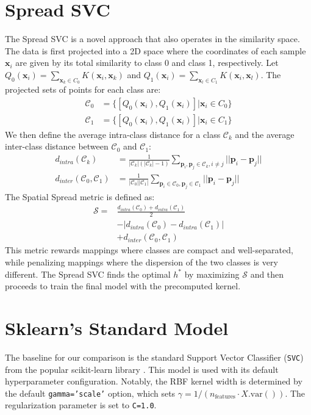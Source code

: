 \documentclass[conference]{IEEEtran}
\begin{document}
\section{Spread SVC}
The Spread SVC is a novel approach that also operates in the similarity space. The data is first projected into a 2D space where the coordinates of each sample $\mathbf{x}_i$ are given by its total similarity to class 0 and class 1, respectively. Let $Q_0(\mathbf{x}_i) = \sum_{\mathbf{x}_k \in C_0} K(\mathbf{x}_i, \mathbf{x}_k)$ and $Q_1(\mathbf{x}_i) = \sum_{\mathbf{x}_l \in C_1} K(\mathbf{x}_i, \mathbf{x}_l)$. The projected sets of points for each class are:
\begin{align}
    \mathcal{C}_0 &= \{[Q_0(\mathbf{x}_i), Q_1(\mathbf{x}_i)] | \mathbf{x}_i \in C_0\} \\
    \mathcal{C}_1 &= \{[Q_0(\mathbf{x}_i), Q_1(\mathbf{x}_i)] | \mathbf{x}_i \in C_1\}
\end{align}
We then define the average intra-class distance for a class $\mathcal{C}_k$ and the average inter-class distance between $\mathcal{C}_0$ and $\mathcal{C}_1$:
\begin{align}
    d_{intra}(\mathcal{C}_k) &= \frac{1}{|\mathcal{C}_k|(|\mathcal{C}_k|-1)} \sum_{\mathbf{p}_i, \mathbf{p}_j \in \mathcal{C}_k, i \neq j} ||\mathbf{p}_i - \mathbf{p}_j|| \\
    d_{inter}(\mathcal{C}_0, \mathcal{C}_1) &= \frac{1}{|\mathcal{C}_0||\mathcal{C}_1|} \sum_{\mathbf{p}_i \in \mathcal{C}_0, \mathbf{p}_j \in \mathcal{C}_1} ||\mathbf{p}_i - \mathbf{p}_j||
\end{align}
The Spatial Spread metric is defined as:
\begin{equation}
\begin{split}
    \mathcal{S} = & \frac{d_{intra}(\mathcal{C}_0) + d_{intra}(\mathcal{C}_1)}{2} \\
                  & - |d_{intra}(\mathcal{C}_0) - d_{intra}(\mathcal{C}_1)| \\
                  & + d_{inter}(\mathcal{C}_0, \mathcal{C}_1)
\end{split}
\end{equation}
This metric rewards mappings where classes are compact and well-separated, while penalizing mappings where the dispersion of the two classes is very different. The Spread SVC finds the optimal $h^*$ by maximizing $\mathcal{S}$ and then proceeds to train the final model with the precomputed kernel.

\section{Sklearn's Standard Model}
The baseline for our comparison is the standard Support Vector Classifier (\texttt{SVC}) from the popular scikit-learn library \cite{b2}. This model is used with its default hyperparameter configuration. Notably, the RBF kernel width is determined by the default \texttt{gamma='scale'} option, which sets $\gamma = 1 / (n_{\text{features}} \cdot X.\text{var}())$. The regularization parameter is set to \texttt{C=1.0}.
\end{document}
